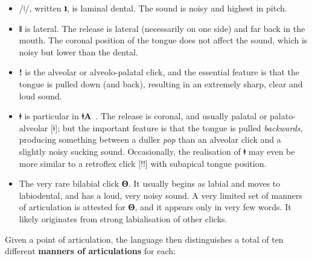 \documentclass[11pt]{book}
\newcommand{\qcn}[1]{\textbf{#1}}
\newcommand{\langname}{\qcn{ǂA}~}
\begin{document}
\begin{itemize}
	\item  /ǀ/, written \qcn{ʇ}, is laminal dental. The sound is noisy and highest in pitch.
	\item \qcn{ǁ} is lateral. The release is lateral (necessarily on one side) and far back in the mouth. The coronal position of the tongue does not affect the sound, which is noisy but lower than the dental.
	\item \qcn{!} is the alveolar or alveolo-palatal click, and the essential feature is that the tongue is pulled down (and back), resulting in an extremely sharp, clear and loud sound.
	 \item \qcn{ǂ} is particular in \langname. The release is coronal, and usually palatal or palato-alveolar [ǂ]; but the important feature is that the tongue is pulled \emph{backwards}, producing something between a duller \emph{pop} than an alveolar click and a slightly noisy sucking sound. Occasionally, the realisation of \qcn{ǂ} may even be more similar to a retroflex click [!!] with subapical tongue position.
	\item The very rare bilabial click \qcn{ʘ}. It usually begins as labial and moves to labiodental, and has a loud, very noisy sound. A very limited set of manners of articulation is attested for \qcn{ʘ}, and it appears only in very few words. It likely originates from strong labialisation of other clicks.
\end{itemize}

Given a point of articulation, the language then distinguishes a total of ten different \textbf{manners of articulations} for each:
\end{document}
